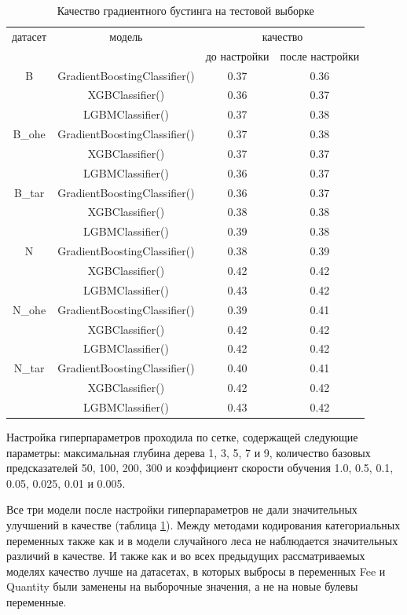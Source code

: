 \documentclass[14pt]{mmcs_article}
\begin{document}
\begin{table}[H]
	\centering
	\caption{Качество градиентного бустинга на тестовой выборке}\label{models:table7}
	\begin{tabular}{cccc}
		\hline
		датасет & модель & \multicolumn{2}{c}{качество} \\
		& & до настройки & после настройки \\
		\hline
		B & GradientBoostingClassifier() & 0.37 & 0.36 \\
		& XGBClassifier() & 0.36 & 0.37 \\
		& LGBMClassifier() & 0.37 & 0.38 \\
		\hline
		B\_ohe & GradientBoostingClassifier() & 0.37 & 0.38 \\
		& XGBClassifier() & 0.37 & 0.37 \\
		& LGBMClassifier() & 0.36 & 0.37 \\
		\hline
		B\_tar & GradientBoostingClassifier() & 0.36 & 0.37 \\
		& XGBClassifier() & 0.38 & 0.38 \\
		& LGBMClassifier() & 0.39 & 0.38 \\
		\hline
		N & GradientBoostingClassifier() & 0.38 & 0.39 \\
		& XGBClassifier() & 0.42 & 0.42 \\
		& LGBMClassifier() & 0.43 & 0.42 \\
		\hline
		N\_ohe & GradientBoostingClassifier() & 0.39 & 0.41 \\
		& XGBClassifier() & 0.42 & 0.42 \\
		& LGBMClassifier() & 0.42 & 0.42 \\
		\hline
		N\_tar & GradientBoostingClassifier() & 0.40 & 0.41 \\
		& XGBClassifier() & 0.42 & 0.42 \\
		& LGBMClassifier() & 0.43 & 0.42 \\ 
		\hline
	\end{tabular}
\end{table}

Настройка гиперпараметров проходила по сетке, содержащей следующие параметры: максимальная глубина дерева 1, 3, 5, 7 и 9, количество базовых предсказателей 50, 100, 200, 300 и коэффициент скорости обучения 1.0, 0.5, 0.1, 0.05, 0.025, 0.01 и 0.005.

Все три модели после настройки гиперпараметров не дали значительных улучшений в качестве (таблица \ref{models:table7}). Между методами кодирования категориальных переменных также как и в модели случайного леса не наблюдается значительных различий в качестве. И также как и во всех предыдущих рассматриваемых моделях качество лучше на датасетах, в которых выбросы в переменных Fee и Quantity были заменены на выборочные значения, а не на новые булевы переменные.
\end{document}
